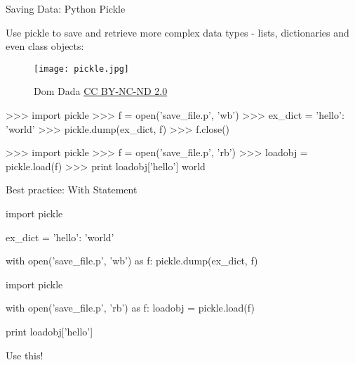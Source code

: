 \begin{frame}[fragile]{Saving Data: Python Pickle}

  Use pickle to save and retrieve more complex data types - lists,
  dictionaries and even class objects:

  \bigskip\pause

  \begin{figure}
    \centering
    \texttt{[image: pickle.jpg]}
    \caption*{\scriptsize  \textcopyright Dom Dada \href{http://creativecommons.org/licenses/by-nc-nd/2.0/}{CC BY-NC-ND 2.0}}
  \end{figure}
  
  \vspace{-5.6cm}
  \begin{mlinepython}
    >>> import pickle 
    >>> f = open('save_file.p', 'wb')
    >>> ex_dict = {'hello': 'world'}
    >>> pickle.dump(ex_dict, f)
    >>> f.close()
  \end{mlinepython}

  \bigskip{}

  \begin{mlinepython}
    >>> import pickle 
    >>> f = open('save_file.p', 'rb')
    >>> loadobj = pickle.load(f)
    >>> print loadobj['hello']
    world
  \end{mlinepython}

\end{frame}


\begin{frame}[fragile]{Best practice: With Statement}


  \begin{mlinepython}
    import pickle 

    ex_dict = {'hello': 'world'}

    with open('save_file.p', 'wb') as f:
        pickle.dump(ex_dict, f)
  \end{mlinepython}

  \bigskip \pause
  \vspace{0.2cm}

  \begin{mlinepython}
    import pickle 

    with open('save_file.p', 'rb') as f:
        loadobj = pickle.load(f)

    print loadobj['hello']
  \end{mlinepython}
  \vspace{0.15cm}
  \begin{arrowlist}
  \item Use this!
  \end{arrowlist}

\end{frame}


